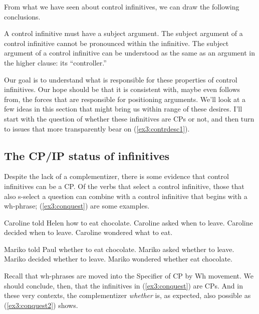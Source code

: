From what we have seen about control infinitives, we can draw the following conclusions.
\begin{exe}
\ex \label{ex3:contrdesc1} 
\begin{xlist}
	\ex A control infinitive must have a subject argument.
	\ex The subject argument of a control infinitive cannot be pronounced within the infinitive.
	\ex The subject argument of a control infinitive can be understood as the same as an argument in the higher clause: its ``controller.''
\end{xlist}
\end{exe}
Our goal is to understand what is responsible for these properties of control infinitives. Our hope should be that it is consistent with, maybe even follows from, the forces that are responsible for positioning arguments. We'll look at a few ideas in this section that might bring us within range of these desires. I'll start with the question of whether these infinitives are CPs or not, and then turn to issues that more transparently bear on (\ref{ex3:contrdesc1}).

\subsection{The CP/IP status of infinitives}

Despite the lack of a complementizer, there is some evidence that control infinitives can be a CP. Of the verbs that select a control infinitive, those that also s-select a question can combine with a control infinitive that begins with a wh-phrase; (\ref{ex3:conquest}) are some examples.
\begin{exe}
\ex \label{ex3:conquest} 
\begin{xlist}
	\ex Caroline told Helen how to eat chocolate.
	\ex Caroline asked when to leave.
	\ex Caroline decided when to leave.
	\ex Caroline wondered what to eat.
\end{xlist}
\ex \label{ex3:conquest2}  
\begin{xlist}
	\ex Mariko told Paul whether to eat chocolate.
	\ex Mariko asked whether to leave.
	\ex Mariko decided whether to leave.
	\ex Mariko wondered whether eat chocolate.
\end{xlist}
\end{exe}
Recall that wh-phrases are moved into the Specifier of CP by Wh movement. We should conclude, then, that the infinitives in (\ref{ex3:conquest}) are CPs. And in these very contexts, the complementizer \emph{whether} is, as expected, also possible as (\ref{ex3:conquest2}) shows.

